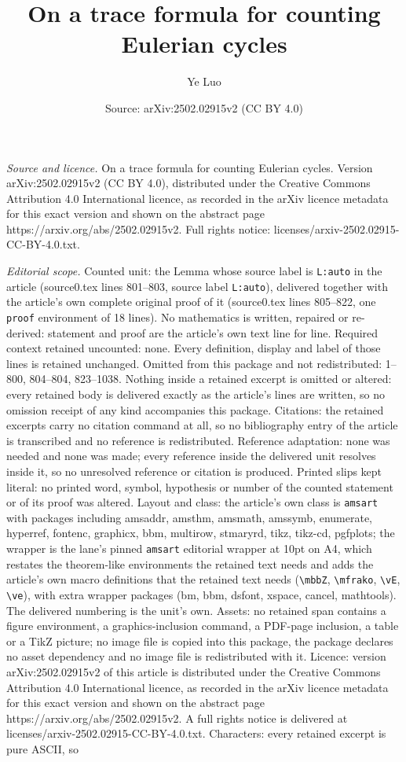 \documentclass[10pt,a4paper]{amsart}
\title[On a trace formula for counting Eulerian cycles]{On a trace formula for counting Eulerian cycles}
\author{Ye Luo}
\date{Source: arXiv:2502.02915v2 (CC BY 4.0)}
\begin{document}
\maketitle

\noindent\emph{Source and licence.} On a trace formula for counting Eulerian cycles. Version arXiv:2502.02915v2 (CC BY 4.0), distributed under the Creative Commons Attribution 4.0 International licence, as recorded in the arXiv licence metadata for this exact version and shown on the abstract page https://arxiv.org/abs/2502.02915v2. Full rights notice: licenses/arxiv-2502.02915-CC-BY-4.0.txt.\par\smallskip

\noindent\textit{Editorial scope.} Counted unit: the Lemma whose source label is \texttt{L:auto} in the article (source0.tex lines 801--803, source label \texttt{L:auto}), delivered together with the article's own complete original proof of it (source0.tex lines 805--822, one \texttt{proof} environment of 18 lines). No mathematics is written, repaired or re-derived: statement and proof are the article's own text line for line. Required context retained uncounted: none. Every definition, display and label of those lines is retained unchanged. Omitted from this package and not redistributed: 1--800, 804--804, 823--1038. Nothing inside a retained excerpt is omitted or altered: every retained body is delivered exactly as the article's lines are written, so no omission receipt of any kind accompanies this package. Citations: the retained excerpts carry no citation command at all, so no bibliography entry of the article is transcribed and no reference is redistributed. Reference adaptation: none was needed and none was made; every reference inside the delivered unit resolves inside it, so no unresolved reference or citation is produced. Printed slips kept literal: no printed word, symbol, hypothesis or number of the counted statement or of its proof was altered. Layout and class: the article's own class is \texttt{amsart} with packages including amsaddr, amsthm, amsmath, amssymb, enumerate, hyperref, fontenc, graphicx, bbm, multirow, stmaryrd, tikz, tikz-cd, pgfplots; the wrapper is the lane's pinned \texttt{amsart} editorial wrapper at 10pt on A4, which restates the theorem-like environments the retained text needs and adds the article's own macro definitions that the retained text needs (\texttt{\textbackslash mbbZ}, \texttt{\textbackslash mfrako}, \texttt{\textbackslash vE}, \texttt{\textbackslash ve}), with extra wrapper packages (bm, bbm, dsfont, xspace, cancel, mathtools). The delivered numbering is the unit's own. Assets: no retained span contains a figure environment, a graphics-inclusion command, a PDF-page inclusion, a table or a TikZ picture; no image file is copied into this package, the package declares no asset dependency and no image file is redistributed with it. Licence: version arXiv:2502.02915v2 of this article is distributed under the Creative Commons Attribution 4.0 International licence, as recorded in the arXiv licence metadata for this exact version and shown on the abstract page https://arxiv.org/abs/2502.02915v2. A full rights notice is delivered at licenses/arxiv-2502.02915-CC-BY-4.0.txt. Characters: every retained excerpt is pure ASCII, so 
\end{document}
